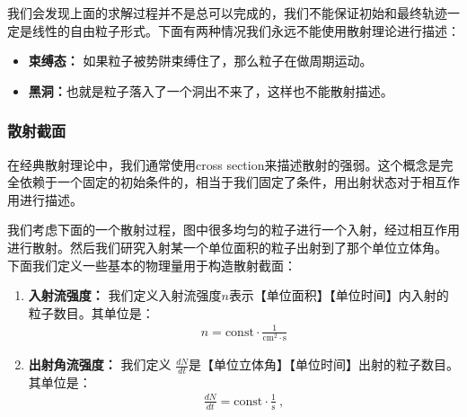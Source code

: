 \bigskip
{}

我们会发现上面的求解过程并不是总可以完成的，我们不能保证初始和最终轨迹一定是线性的自由粒子形式。下面有两种情况我们永远不能使用散射理论进行描述：
\begin{itemize}
  \item \textbf{束缚态：} 如果粒子被势阱束缚住了，那么粒子在做周期运动。
  \item \textbf{黑洞：}也就是粒子落入了一个洞出不来了，这样也不能散射描述。
\end{itemize}

\subsubsection{散射截面}

\bigskip
{}

在经典散射理论中，我们通常使用cross
section来描述散射的强弱。这个概念是完全依赖于一个固定的初始条件的，相当于我们固定了条件，用出射状态对于相互作用进行描述。

我们考虑下面的一个散射过程，图中很多均匀的粒子进行一个入射，经过相互作用进行散射。然后我们研究入射某一个单位面积的粒子出射到了那个单位立体角。
下面我们定义一些基本的物理量用于构造散射截面：
\begin{enumerate}
  \item \textbf{入射流强度：} 我们定义入射流强度$ n $表示【单位面积】【单位时间】内入射的粒子数目。其单位是：
    \begin{align}
      n=\mathrm{const}\cdot\frac{1}{\mathrm{cm}^2\cdot\mathrm{s}}
    \end{align}
  \item \textbf{出射角流强度：} 我们定义 $ \displaystyle\frac{dN}{dt}
    $是【单位立体角】【单位时间】出射的粒子数目。其单位是：
    \begin{align}
      \displaystyle\frac{dN}{dt}=\mathrm{const}\cdot\frac{1}{\mathrm{s}}\mathrm{~,}
    \end{align}
\end{enumerate}

